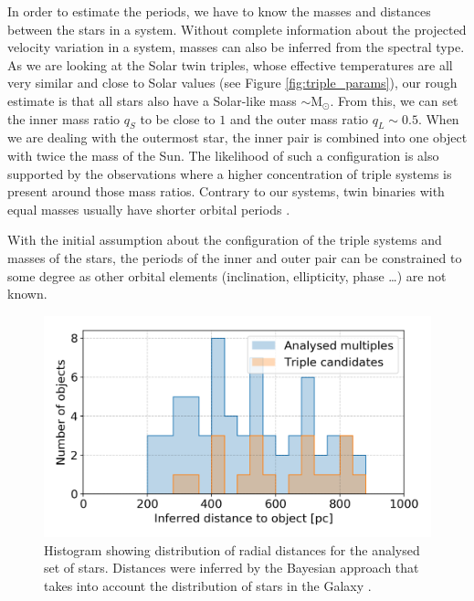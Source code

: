 In order to estimate the periods, we have to know the masses and distances between the stars in a system. Without complete information about the projected velocity variation in a system, masses can also be inferred from the spectral type. As we are looking at the Solar twin triples, whose effective temperatures are all very similar and close to Solar values (see Figure \ref{fig:triple_params}), our rough estimate is that all stars also have a Solar-like mass $\sim$M$_{\odot}$. From this, we can set the inner mass ratio $q_S$ to be close to $1$ and the outer mass ratio $q_L \sim 0.5$. When we are dealing with the outermost star, the inner pair is combined into one object with twice the mass of the Sun. The likelihood of such a configuration is also supported by the observations \citep{2008MNRAS.389..925T} where a higher concentration of triple systems is present around those mass ratios. Contrary to our systems, twin binaries with equal masses usually have shorter orbital periods \citep{2000A&A...360..997T}. 

With the initial assumption about the configuration of the triple systems and masses of the stars, the periods of the inner and outer pair can be constrained to some degree as other orbital elements (inclination, ellipticity, phase \ldots) are not known.

\begin{figure}
	\centering
	\includegraphics[width=\columnwidth]{dist_pc.png}
	\caption{Histogram showing distribution of radial distances for the analysed set of stars. Distances were inferred by the Bayesian approach that takes into account the distribution of stars in the Galaxy \citep{2018AJ....156...58B}.}
	\label{fig:gaia_dist}
\end{figure}


